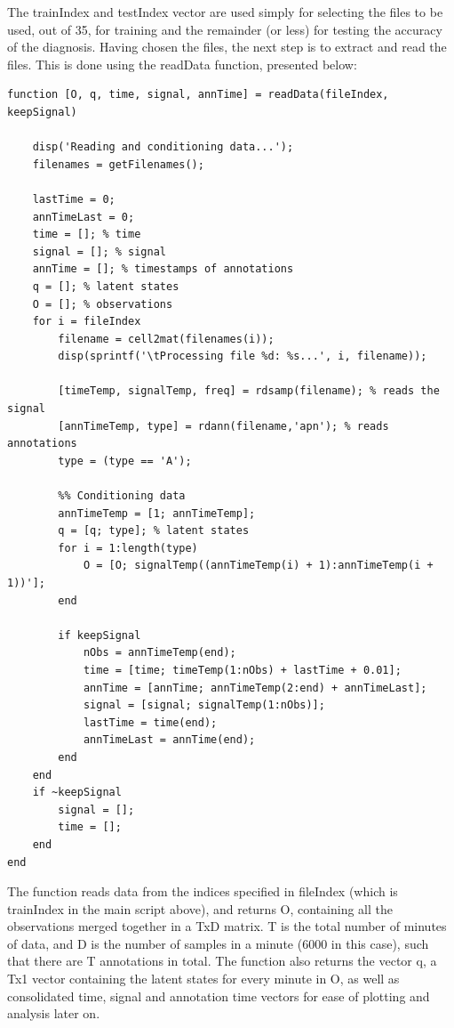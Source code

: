 The trainIndex and testIndex vector are used simply for selecting the files to be used, out of 35, for training and the remainder (or less) for testing the accuracy of the diagnosis. Having chosen the files, the next step is to extract and read the files. This is done using the readData function, presented below:

\begin{lstlisting}
function [O, q, time, signal, annTime] = readData(fileIndex, keepSignal)

    disp('Reading and conditioning data...');
    filenames = getFilenames();
    
    lastTime = 0;
    annTimeLast = 0;
    time = []; % time
    signal = []; % signal
    annTime = []; % timestamps of annotations
    q = []; % latent states
    O = []; % observations
    for i = fileIndex
        filename = cell2mat(filenames(i));
        disp(sprintf('\tProcessing file %d: %s...', i, filename));
        
        [timeTemp, signalTemp, freq] = rdsamp(filename); % reads the signal
        [annTimeTemp, type] = rdann(filename,'apn'); % reads annotations
        type = (type == 'A');

        %% Conditioning data
        annTimeTemp = [1; annTimeTemp];
        q = [q; type]; % latent states
        for i = 1:length(type)
            O = [O; signalTemp((annTimeTemp(i) + 1):annTimeTemp(i + 1))'];
        end
        
        if keepSignal
            nObs = annTimeTemp(end);
            time = [time; timeTemp(1:nObs) + lastTime + 0.01];
            annTime = [annTime; annTimeTemp(2:end) + annTimeLast];
            signal = [signal; signalTemp(1:nObs)];
            lastTime = time(end);
            annTimeLast = annTime(end);
        end
    end
    if ~keepSignal
        signal = [];
        time = [];
    end
end
\end{lstlisting}

The function reads data from the indices specified in fileIndex (which is trainIndex in the main script above), and returns O, containing all the observations merged together in a TxD matrix. T is the total number of minutes of data, and D is the number of samples in a minute (6000 in this case), such that there are T annotations in total. The function also returns the vector q, a Tx1 vector containing the latent states for every minute in O, as well as consolidated time, signal and annotation time vectors for ease of plotting and analysis later on.

